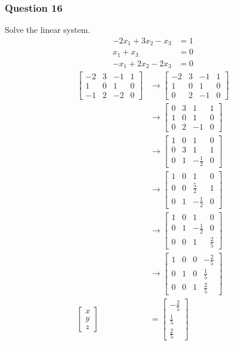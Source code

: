 \documentclass{math}
\begin{document}
\subsubsection*{Question 16}
Solve the linear system.
\begin{align*}
  -2x_1+3x_2-x_3 &= 1 \\
  x_1+x_3 &= 0 \\
  -x_1+2x_2-2x_3 &= 0
\end{align*}
\begin{align*}
  \begin{bmatrix}
    -2 & 3 & -1 & 1 \\
    1 & 0 & 1 & 0 \\
    -1 & 2 & -2 & 0
  \end{bmatrix} &\to \begin{bmatrix}
    -2 & 3 & -1 & 1 \\
    1 & 0 & 1 & 0 \\
    0 & 2 & -1 & 0
  \end{bmatrix} \\
  &\to \begin{bmatrix}
    0 & 3 & 1 & 1 \\
    1 & 0 & 1 & 0 \\
    0 & 2 & -1 & 0
  \end{bmatrix} \\
  &\to \begin{bmatrix}
    1 & 0 & 1 & 0 \\
    0 & 3 & 1 & 1 \\
    0 & 1 & -\frac{1}{2} & 0
  \end{bmatrix} \\
  &\to \begin{bmatrix}
    1 & 0 & 1 & 0 \\
    0 & 0 & \frac{5}{2} & 1 \\
    0 & 1 & -\frac{1}{2} & 0
  \end{bmatrix} \\
  &\to \begin{bmatrix}
    1 & 0 & 1 & 0 \\
    0 & 1 & -\frac{1}{2} & 0 \\
    0 & 0 & 1 & \frac{2}{5}
  \end{bmatrix} \\
  &\to \begin{bmatrix}
    1 & 0 & 0 & -\frac{2}{5} \\
    0 & 1 & 0 & \frac{1}{5} \\
    0 & 0 & 1 & \frac{2}{5}
  \end{bmatrix} \\
  \begin{bmatrix}x \\ y \\ z\end{bmatrix} &= \begin{bmatrix}
    -\frac{2}{5} \\ \frac{1}{5} \\ \frac{2}{5}\end{bmatrix}
\end{align*}
\end{document}
